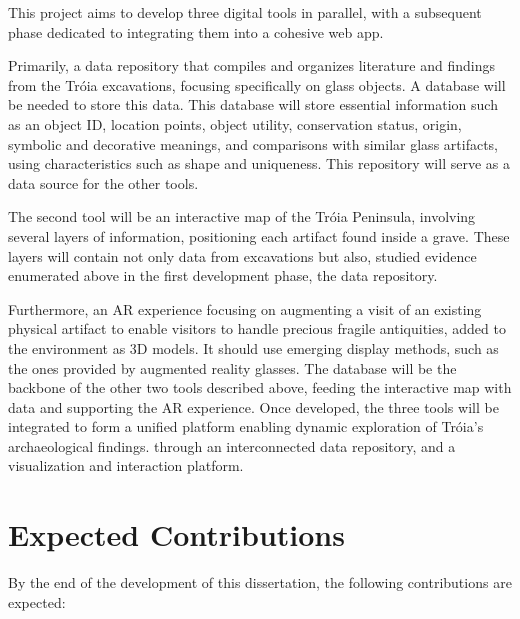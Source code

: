 This project aims to develop three digital tools in parallel, with a subsequent phase dedicated to 
integrating them into a cohesive web app.


Primarily, a data repository that compiles and organizes literature and findings from 
the Tróia excavations, focusing specifically on glass objects. A database will be needed to store this data. 
This database will store essential information such as an object ID, location points, object utility,
conservation status, origin, symbolic and decorative meanings, and comparisons with similar glass artifacts, using characteristics such as shape and uniqueness. 
This repository will serve as a data source for the other tools.


The second tool will be an interactive map of the Tróia Peninsula, involving several layers of information, positioning each 
artifact found inside a grave. These layers will contain not only data from excavations but also, 
studied evidence enumerated above in the first development phase, the data repository.
 
Furthermore, an \gls{AR} experience focusing on augmenting a visit of an existing physical 
artifact to enable visitors to handle precious fragile antiquities, added to the environment as 3D models. 
It should use emerging display methods, such as the ones provided by augmented reality glasses.
The database will be the backbone of the other two tools described above, feeding the interactive map with data and supporting the \gls{AR} experience.
Once developed, the three tools will be integrated to form a unified platform enabling dynamic exploration of Tróia's archaeological findings.
through an interconnected data repository, and a visualization and interaction platform.




\section{Expected Contributions}
\label{sec:expected_contributions}


By the end of the development of this dissertation, the following contributions are expected:



